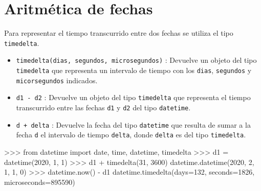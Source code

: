 \documentclass[
  spanish,
  a4paper,
]{scrreport}
\newenvironment{Shaded}{\begin{snugshade}}{\end{snugshade}}
\newcommand{\DecValTok}[1]{\textcolor[rgb]{0.68,0.00,0.00}{#1}}
\newcommand{\ImportTok}[1]{\textcolor[rgb]{0.00,0.46,0.62}{#1}}
\newcommand{\NormalTok}[1]{\textcolor[rgb]{0.00,0.23,0.31}{#1}}
\newcommand{\OperatorTok}[1]{\textcolor[rgb]{0.37,0.37,0.37}{#1}}
\providecommand{\tightlist}{%
  \setlength{\itemsep}{0pt}\setlength{\parskip}{0pt}}
\begin{document}
\section{Aritmética de fechas}\label{aritmuxe9tica-de-fechas}

Para representar el tiempo transcurrido entre dos fechas se utiliza el
tipo \texttt{timedelta}.

\begin{itemize}
\tightlist
\item
  \texttt{timedelta(dias,\ segundos,\ microsegundos)} : Devuelve un
  objeto del tipo \texttt{timedelta} que representa un intervalo de
  tiempo con los \texttt{dias}, \texttt{segundos} y
  \texttt{micorsegundos} indicados.
\item
  \texttt{d1\ -\ d2} : Devuelve un objeto del tipo \texttt{timedelta}
  que representa el tiempo transcurrido entre las fechas \texttt{d1} y
  \texttt{d2} del tipo \texttt{datetime}.
\item
  \texttt{d\ +\ delta} : Devuelve la fecha del tipo \texttt{datetime}
  que resulta de sumar a la fecha \texttt{d} el intervalo de tiempo
  \texttt{delta}, donde \texttt{delta} es del tipo \texttt{timedelta}.
\end{itemize}

\begin{Shaded}
\begin{Highlighting}[]
\OperatorTok{\textgreater{}\textgreater{}\textgreater{}} \ImportTok{from}\NormalTok{ datetime }\ImportTok{import}\NormalTok{ date, time, datetime, timedelta}
\OperatorTok{\textgreater{}\textgreater{}\textgreater{}}\NormalTok{ d1 }\OperatorTok{=}\NormalTok{ datetime(}\DecValTok{2020}\NormalTok{, }\DecValTok{1}\NormalTok{, }\DecValTok{1}\NormalTok{)}
\OperatorTok{\textgreater{}\textgreater{}\textgreater{}}\NormalTok{ d1 }\OperatorTok{+}\NormalTok{ timedelta(}\DecValTok{31}\NormalTok{, }\DecValTok{3600}\NormalTok{)}
\NormalTok{datetime.datetime(}\DecValTok{2020}\NormalTok{, }\DecValTok{2}\NormalTok{, }\DecValTok{1}\NormalTok{, }\DecValTok{1}\NormalTok{, }\DecValTok{0}\NormalTok{)}
\OperatorTok{\textgreater{}\textgreater{}\textgreater{}}\NormalTok{ datetime.now() }\OperatorTok{{-}}\NormalTok{ d1}
\NormalTok{datetime.timedelta(days}\OperatorTok{=}\DecValTok{132}\NormalTok{, seconds}\OperatorTok{=}\DecValTok{1826}\NormalTok{, microseconds}\OperatorTok{=}\DecValTok{895590}\NormalTok{)}
\end{Highlighting}
\end{Shaded}

\end{document}
